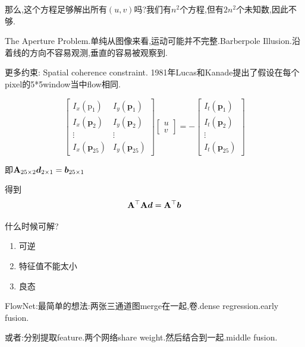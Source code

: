 	那么,这个方程足够解出所有$(u, v)$吗?我们有$n^2$个方程,但有$2n^2$个未知数,因此不够.
	
	The Aperture Problem.单纯从图像来看,运动可能并不完整.Barberpole Illusion.沿着线的方向不容易观测,垂直的容易被观察到.
	
	更多约束: Spatial coherence constraint. 1981年Lucas和Kanade提出了假设在每个pixel的5*5window当中flow相同.
	
	\begin{equation}
		\left[\begin{array}{cc}
			I_{x}\left(\mathrm{p}_{1}\right) & I_{y}\left(\mathbf{p}_{1}\right) \\
			I_{x}\left(\mathbf{p}_{2}\right) & I_{y}\left(\mathbf{p}_{2}\right) \\
			\vdots & \vdots \\
			I_{x}\left(\mathbf{p}_{25}\right) & I_{y}\left(\mathbf{p}_{25}\right)
		\end{array}\right]\left[\begin{array}{l}
			u \\
			v
		\end{array}\right]=-\left[\begin{array}{c}
			I_{t}\left(\mathbf{p}_{1}\right) \\
			I_{t}\left(\mathbf{p}_{2}\right) \\
			\vdots \\
			I_{t}\left(\mathbf{p}_{25}\right)
		\end{array}\right]
	\end{equation}

	即$\bold{A}_{25\times 2} \boldsymbol d_{2\times 1} = \boldsymbol b_{25\times 1}$
	
	得到
	\begin{equation}
		\bold{A}^\top \bold{A} \boldsymbol d = \bold{A}^\top \boldsymbol b
	\end{equation}

	什么时候可解?
	\begin{enumerate}
		\item 可逆
		\item 特征值不能太小
		\item 良态
	\end{enumerate}

	FlowNet:最简单的想法:两张三通道图merge在一起,卷.dense regression.early fusion.
	
	或者:分别提取feature.两个网络share weight.然后结合到一起.middle fusion.
	

